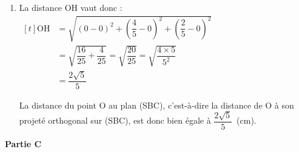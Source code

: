 \begin{enumerate}
\begin{enumerate}
Donc H est le point de (OH) dont le paramètre fait que les coordonnées paramétriques vérifient l'équation de (SBC).

On résout donc : 
\quad $\begin{aligned}[t]
	4t+t-2= 0 & \iff 5t = 2\\
	& \iff t = \dfrac{2}{5}
	\end{aligned}$

H est donc le point de paramètre $t = \dfrac{2}{5}$ sur (OH),

donc ses coordonnées sont : \quad $\mathrm{H} \left(0 ~;~ \dfrac{4}{5} ~;~ \dfrac{2}{5}\right)$.

\item La distance OH vaut donc : \quad $\begin{aligned}[t]
	\mathrm{OH} &= \sqrt{(0-0)^2 + \left(\dfrac{4}{5}-0 \right)^2 + \left(\dfrac{2}{5} -0 \right)^2}\\
			& =\sqrt{\dfrac{16}{25} + \dfrac{4}{25}}=\sqrt{\dfrac{20}{25}}=\sqrt{\dfrac{4 \times 5}{5^2}}\\
			&=\dfrac{2\sqrt{5}}{5}
		\end{aligned}$

	La distance du point O au plan (SBC), c'est-à-dire la distance de O à son projeté orthogonal sur (SBC), est donc bien égale à $\dfrac{2 \sqrt{5}}{5}$~(cm).
		\end{enumerate}
	\end{enumerate}

\textbf{Partie C}

